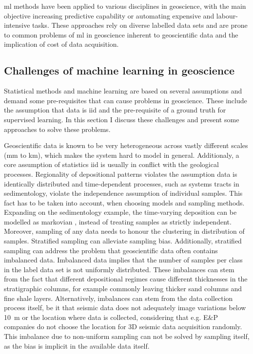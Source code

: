 \acl{ml} methods have been applied to various disciplines in geoscience, with the main objective increasing predictive capability or automating expensive and labour-intensive tasks. These approaches rely on diverse labelled data sets and are prone to common problems of \ac{ml} in geoscience inherent to geoscientific data and the implication of cost of data acquisition.

\subsection{Challenges of machine learning in geoscience}
Statistical methods and machine learning are based on several assumptions and demand some pre-requisites that can cause problems in geoscience. These include the assumption that data is \acf{iid} and the pre-requisite of a ground truth for supervised learning. In this section I discuss these challenges and present some approaches to solve these problems.


Geoscientific data is known to be very heterogeneous across vastly different scales (mm to km), which makes the system hard to model in general. Additionaly, a core assumption of statistics \ac{iid} is usually in conflict with the geological processes. Regionality of depositional patterns violates the assumption data is identically distributed and time-dependent processes, such as systems tracts in sedimentology, violate the independence assumption of individual samples. This fact has to be taken into account, when choosing models and sampling methods. Expanding on the sedimentology example, the time-varying deposition can be modelled as markovian \citep{schwarzacher1972semi}, instead of treating samples as strictly independent. Moreover, sampling of any data needs to honour the clustering in distribution of samples. Stratified sampling \citep{kish1965survey} can alleviate sampling bias. Additionally, stratified sampling can address the problem that geoscientific data often contains imbalanced data. Imbalanced data implies that the number of samples per class in the label data set is not uniformly distributed. These imbalances can stem from the fact that different depositional regimes cause different thicknesses in the stratigraphic columns, for example commonly leaving thicker sand columns and fine shale layers. Alternatively, imbalances can stem from the data collection process itself, be it that seismic data does not adequately image variations below 10~m or the location where data is collected, considering that e.g. E\&P companies do not choose the location for 3D seismic data acquisition randomly. This imbalance due to non-uniform sampling can not be solved by sampling itself, as the bias is implicit in the available data itself. 

